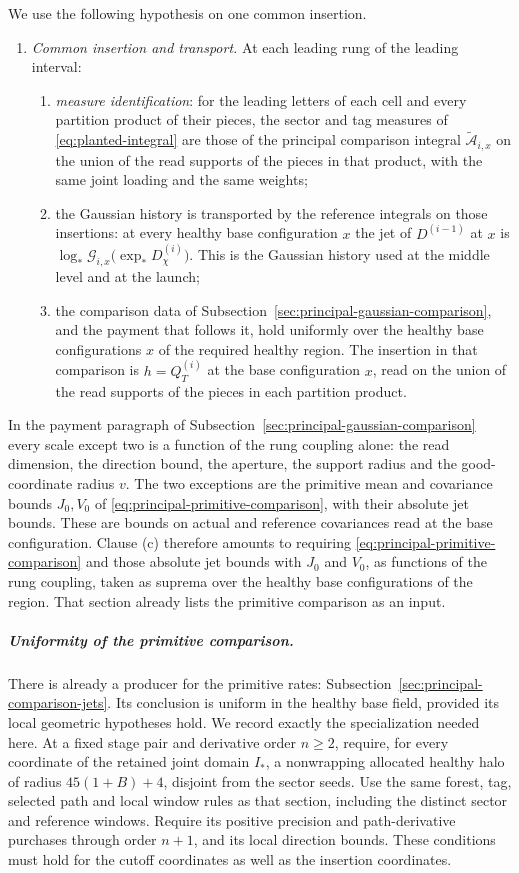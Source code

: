 We use the following hypothesis on one common insertion.
\begin{enumerate}
\item[(CI)] \emph{Common insertion and transport.} At each leading rung of
 the leading interval:
 \begin{enumerate}
 \item[(a)] \emph{measure identification}: for the leading letters of
  each cell and every partition product of their pieces, the sector and
  tag measures of \eqref{eq:planted-integral} are those of the principal
  comparison integral $\widetilde{\mathcal A}_{i,x}$ on the union of the
  read supports of the pieces in that product, with the same joint loading
  and the same weights;
 \item[(b)] the Gaussian history is transported by the reference
  integrals on those insertions: at every healthy base configuration
  $x$ the jet of $D^{(i-1)}$ at $x$ is
  $\log_*\mathcal G_{i,x}\bigl(\exp_*D^{(i)}_\chi\bigr)$. This is the
  Gaussian history used at the middle level and at the launch;
 \item[(c)] the comparison data of
  Subsection~\ref{sec:principal-gaussian-comparison}, and the payment that
  follows it, hold uniformly over the healthy base configurations $x$ of
  the required healthy region. The insertion in that comparison is
  $h=Q^{(i)}_T$ at the base configuration $x$, read on the union of the
  read supports of the pieces in each partition product.
 \end{enumerate}
\end{enumerate}
In the payment paragraph of Subsection~\ref{sec:principal-gaussian-comparison}
every scale except two is a function of the rung coupling alone: the read
dimension, the direction bound, the aperture, the support radius and the
good-coordinate radius $v$. The two exceptions are the primitive mean and
covariance bounds $J_0,V_0$ of \eqref{eq:principal-primitive-comparison},
with their absolute jet bounds. These are bounds on actual and reference
covariances read at the base configuration. Clause (c) therefore amounts
to requiring \eqref{eq:principal-primitive-comparison} and those absolute
jet bounds with $J_0$ and $V_0$, as functions of the rung coupling, taken
as suprema over the healthy base configurations of the region. That section already lists the
primitive comparison as an input.
\subparagraph{Uniformity of the primitive comparison.}
There is already a producer for the primitive rates:
Subsection~\ref{sec:principal-comparison-jets}. Its conclusion is uniform
in the healthy base field, provided its local geometric hypotheses
hold. We record exactly the specialization needed here. At a fixed
stage pair and derivative order $n\ge2$, require, for every coordinate
of the retained joint domain $I_*$, a nonwrapping allocated healthy
halo of radius $45(1+B)+4$, disjoint from the sector seeds. Use the
same forest, tag, selected path and local window rules as that section,
including the distinct sector and reference windows. Require its
positive precision and path-derivative purchases through order $n+1$,
and its local direction bounds. These conditions must hold for the
cutoff coordinates as well as the insertion coordinates.

